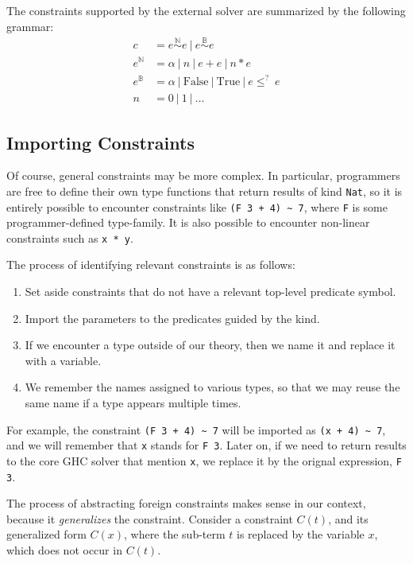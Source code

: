 \documentclass{sigplanconf}
\begin{document}
The constraints supported by the external solver are summarized by the
following grammar:
\begin{align*}
c & = e \overset {\mathbb{N}} \sim e ~|~  e \overset {\mathbb{B}} \sim e \\
e^\mathbb{N} & = \alpha ~|~ n ~|~ e + e ~|~ n * e \\
e^\mathbb{B} & = \alpha ~|~ \mathrm{False} ~|~ \mathrm{True} ~|~ e \leq^? ~e \\
n          & = 0 ~|~ 1 ~|~ \dots
\end{align*}


\subsection{Importing Constraints}

Of course, general constraints may be more complex.  In particular,
programmers are free to define their own type functions that return
results of kind \Verb"Nat", so it is entirely possible to encounter
constraints like \Verb"(F 3 + 4) ~ 7", where \Verb"F" is some programmer-defined
type-family.  It is also possible to encounter non-linear constraints such
as \Verb"x * y".

The process of identifying relevant constraints is as follows:
\begin{enumerate}
\item Set aside constraints that do not have a relevant top-level predicate
symbol.
\item Import the parameters to the predicates guided by the kind.
\item If we encounter a type outside of our theory, then we name it and replace
      it with a variable.
\item We remember the names assigned to various types, so that we may reuse
      the same name if a type appears multiple times.
\end{enumerate}

For example, the constraint \Verb"(F 3 + 4) ~ 7" will be imported as
\Verb"(x + 4) ~ 7", and we will remember that \Verb"x" stands for \Verb"F 3".
Later on, if we need to return results to the core GHC solver that mention
\Verb"x", we replace it by the orignal expression, \Verb"F 3".

The process of abstracting foreign constraints makes sense in our context,
because it {\em generalizes} the constraint.  Consider a constraint $C(t)$, and
its generalized form $C(x)$, where the sub-term $t$ is replaced by
the variable $x$, which does not occur in $C(t)$.
\end{document}
